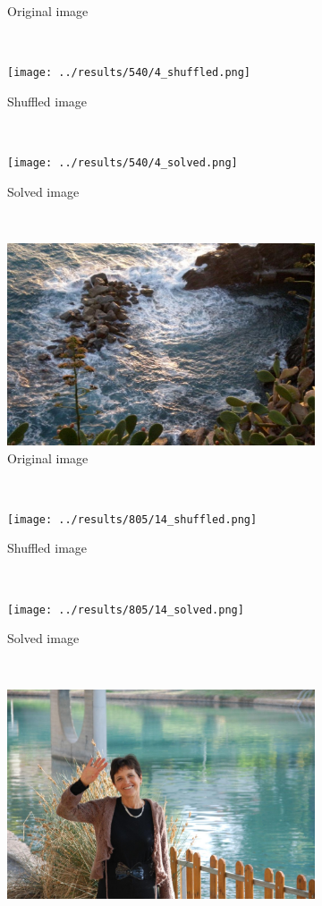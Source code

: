 \documentclass[11pt]{report}
\begin{document}
\begin{figure}
\begin{subfigure}[b]{0.3\textwidth}
		\caption{Original image}
	\end{subfigure}
	~
	\begin{subfigure}[b]{0.3\textwidth}
		\texttt{[image: ../results/540/4\_shuffled.png]}
		\caption{Shuffled image}
	\end{subfigure}
	~
	\begin{subfigure}[b]{0.3\textwidth}
		\texttt{[image: ../results/540/4\_solved.png]}
		\caption{Solved image}
	\end{subfigure}
  ~
  \begin{subfigure}[b]{0.3\textwidth}
		\includegraphics[width=\textwidth]{../imData/805/14.jpg}
		\caption{Original image}
	\end{subfigure}
	~
	\begin{subfigure}[b]{0.3\textwidth}
		\texttt{[image: ../results/805/14\_shuffled.png]}
		\caption{Shuffled image}
	\end{subfigure}
	~
	\begin{subfigure}[b]{0.3\textwidth}
		\texttt{[image: ../results/805/14\_solved.png]}
		\caption{Solved image}
	\end{subfigure}
   ~
  \begin{subfigure}[b]{0.3\textwidth}
		\includegraphics[width=\textwidth]{../imData/2360/1.jpg}

\end{subfigure}
\end{figure}
\end{document}
